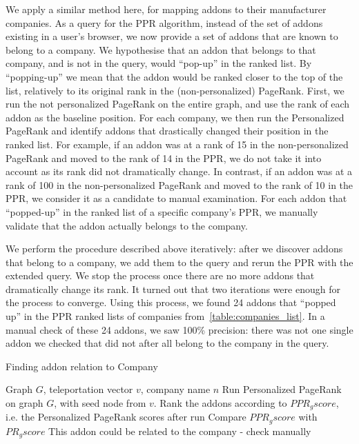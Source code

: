 \documentclass[11pt,oneside]{book}
\begin{document}
We apply a similar method here, for mapping addons to their manufacturer companies. As a query for the PPR algorithm, instead of the set of addons existing in a user's browser, we now provide a set of addons that are known to belong to a company. We hypothesise that an addon that belongs to that company, and is not in the query, would ``pop-up'' in the ranked list. By ``popping-up'' we mean that the addon would be ranked closer to the top of the list, relatively to its original rank in the (non-personalized) PageRank. First, we run the not personalized PageRank on the entire graph, and use the rank of each addon as the baseline position. For each company, we then run the Personalized PageRank and identify addons that drastically changed their position in the ranked list. For example, if an addon was at a rank of 15 in the non-personalized PageRank and moved to the rank of 14 in the PPR, we do not take it into account as its rank did not dramatically change. In contrast, if an addon was at a rank of 100 in the non-personalized PageRank and moved to the rank of 10 in the PPR, we consider it as a candidate to manual examination. For each addon that ``popped-up'' in the ranked list of a specific company's PPR, we manually validate that the addon actually belongs to the company.

We perform the procedure described above iteratively: after we discover addons that belong to a company, we add them to the query and rerun the PPR with the extended query. We stop the process once there are no more addons that dramatically change its rank. It turned out that two iterations were enough for the process to converge. Using this process, we found 24 addons that ``popped up'' in the PPR ranked lists of companies from~\autoref{table:companies_list}. In a manual check of these 24 addons, we saw 100\% precision: there was not one single addon we checked that did not after all belong to the company in the query. 

\begin{algorithm}[!t]
\caption{Finding addon relation to Company}
\label{alg:find_addon_species}
\begin{algorithmic}[1] 
\REQUIRE Graph $G$, teleportation vector $v$, company name $n$
\STATE Run Personalized PageRank on graph $G$, with seed node from $v$.
\STATE Rank the addons according to $PPR_gscore$, i.e. the Personalized PageRank scores after run
\STATE Compare $PPR_gscore$ with $PR_gscore$
\STATE This addon could be related to the company - check manually
\ENDIF
\ENDFOR
\end{algorithmic}
\end{algorithm}
\end{document}
